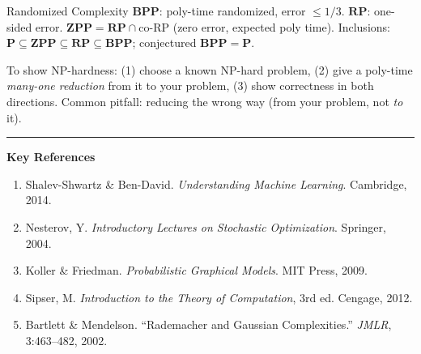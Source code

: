 \documentclass[10pt, letterpaper]{article}
\begin{document}
\begin{defbox}{Randomized Complexity}
$\mathbf{BPP}$: poly-time randomized, error $\le 1/3$. $\mathbf{RP}$: one-sided error.
$\mathbf{ZPP} = \mathbf{RP}\cap\mathrm{co\text{-}RP}$ (zero error, expected poly time).
Inclusions: $\mathbf{P}\subseteq\mathbf{ZPP}\subseteq\mathbf{RP}\subseteq\mathbf{BPP}$;
conjectured $\mathbf{BPP}=\mathbf{P}$.
\end{defbox}

\begin{examtip}
To show NP-hardness: (1) choose a known NP-hard problem, (2) give a poly-time
\emph{many-one reduction} from it to your problem, (3) show correctness in both
directions. Common pitfall: reducing the wrong way (from your problem, not \emph{to} it).
\end{examtip}

\vspace{6pt}
\noindent\textcolor{rulecolor}{\rule{\linewidth}{0.8pt}}
{\small\bfseries\color{accent} Key References}\\[3pt]
{\small
\begin{enumerate}[leftmargin=1.8em, itemsep=1pt, topsep=0pt]
  \item Shalev-Shwartz \& Ben-David. \textit{Understanding Machine Learning}. Cambridge, 2014.
  \item Nesterov, Y. \textit{Introductory Lectures on Stochastic Optimization}. Springer, 2004.
  \item Koller \& Friedman. \textit{Probabilistic Graphical Models}. MIT Press, 2009.
  \item Sipser, M. \textit{Introduction to the Theory of Computation}, 3rd ed. Cengage, 2012.
  \item Bartlett \& Mendelson. ``Rademacher and Gaussian Complexities.'' \textit{JMLR}, 3:463--482, 2002.
\end{enumerate}
}
\end{document}

